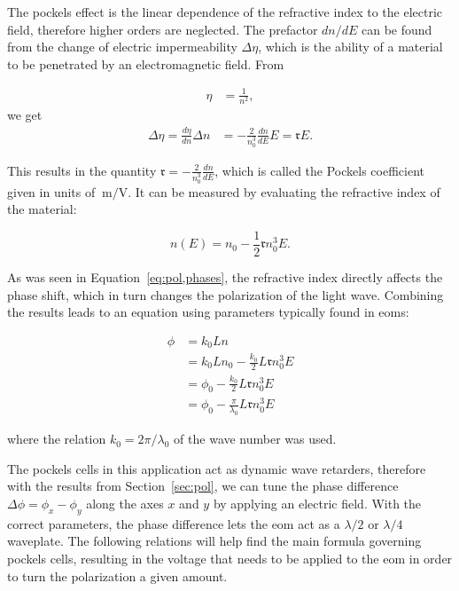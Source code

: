 The pockels effect is the linear dependence of the refractive index to the electric field, therefore higher orders are neglected. The prefactor $dn / dE$ can be found from the change of electric impermeability $\Delta \eta$, which is the ability of a material to be penetrated by an electromagnetic field. From

\begin{align}
	\eta & = \frac{1}{n^2},
\end{align}
we get
\begin{align}
	\label{eq:pockel,refr}
	\Delta \eta = \frac{d \eta}{dn} \Delta n & = -\frac{2}{n_0^3} \frac{dn}{dE} E = \mathfrak{r} E.
\end{align}

This results in the quantity $\mathfrak{r} = -\frac{2}{n_0^3} \frac{dn}{dE}$, which is called the Pockels coefficient given in units of $\SI{}{\meter\per\volt}$. It can be measured by evaluating the refractive index of the material:

\begin{equation}
	n(E) = n_0 - \frac{1}{2} \mathfrak{r} n_0^3 E.
\end{equation}

As was seen in Equation~\ref{eq:pol,phases}, the refractive index directly affects the phase shift, which in turn changes the polarization of the light wave. Combining the results leads to an equation using parameters typically found in \acp{eom}:

\begin{align}
	\phi & = k_0 L n \\
		 & = k_0 L n_0 - \frac{k_0}{2} L \mathfrak{r} n_0^3 E \\
		 & = \phi_0 - \frac{k_0}{2} L \mathfrak{r} n_0^3 E \\
		 & = \phi_0 - \frac{\pi}{\lambda_0} L \mathfrak{r} n_0^3 E
\end{align}

where the relation $k_0 = 2 \pi / \lambda_0$ of the wave number was used.

The pockels cells in this application act as dynamic wave retarders, therefore with the results from Section~\ref{sec:pol}, we can tune the phase difference $\Delta \phi = \phi_x - \phi_y$ along the axes $x$ and $y$ by applying an electric field. With the correct parameters, the phase difference lets the \ac{eom} act as a $\lambda / 2$ or $\lambda / 4$ waveplate. The following relations will help find the main formula governing pockels cells, resulting in the voltage that needs to be applied to the \ac{eom} in order to turn the polarization a given amount.

